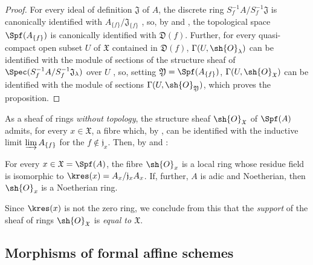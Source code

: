 \begin{proof}
For every ideal of definition $\mathfrak{J}$ of $A$, the discrete ring $S_f^{-1}A/ S_f^{-1}\mathfrak{J}$ is canonically identified with $A_{\{f\}}/\mathfrak{J}_{\{f\}}$ , so, by  and , the topological space $\Spf(A_{\{f\}})$ is canonically identified with $\mathfrak{D}(f)$.
Further, for every quasi-compact open subset $U$ of $\mathfrak{X}$ contained in $\mathfrak{D}(f)$, $\Gamma(U,\sh{O}_\lambda)$ can be identified with the module of sections of the structure sheaf of $\Spec(S_f^{-1}A/ S_f^{-1}\mathfrak{J}_\lambda)$ over $U$ , so, setting $\mathfrak{Y}=\Spf(A_{\{f\}})$, $\Gamma(U,\sh{O}_\mathfrak{X})$ can be identified with the module of sections $\Gamma(U,\sh{O}_\mathfrak{Y})$, which proves the proposition.
\end{proof}

\begin{env}[10.1.5]
\label{I.10.1.5}
As a sheaf of rings \emph{without topology}, the structure sheaf $\sh{O}_\mathfrak{X}$ of $\Spf(A)$ admits, for every $x\in\mathfrak{X}$, a fibre which, by , can be identified with the inductive limit $\varinjlim A_{\{f\}}$ for the $f\not\in\mathfrak{j}_x$.
Then, by  and :
\end{env}

\begin{proposition}[10.1.6]
\label{I.10.1.6}
For every $x\in\mathfrak{X}=\Spf(A)$, the fibre $\sh{O}_x$ is a local ring whose residue field is isomorphic to $\kres(x)=A_x/\mathfrak{j}_xA_x$.
If, further, $A$ is adic and Noetherian, then $\sh{O}_x$ is a Noetherian ring.
\end{proposition}

Since $\kres(x)$ is not the zero ring, we conclude from this that the \emph{support} of the sheaf of rings $\sh{O}_\mathfrak{X}$ is \emph{equal to $\mathfrak{X}$}.

\subsection{Morphisms of formal affine schemes}
\label{subsection:I.10.2}

